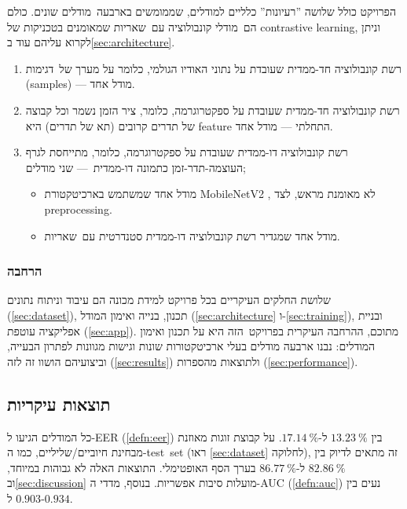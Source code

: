 \documentclass[hebrew, a4paper]{article}
\theoremstyle{plain}
\theoremstyle{definition}
\numberwithin{equation}{section}
\begin{document}
הפרויקט כולל שלושה ”רעיונות” כלליים למודלים, שממומשים בארבעה~מודלים
שונים. כולם הם~מודלי קונבולוציה עם~שאריות  שמאומנים
בטכניקות של contrastive learning, וניתן לקרוא עליהם עוד
ב\autoref{sec:architecture}.
\begin{enumerate}
\item רשת קונבולוציה חד-ממדית שעובדת על נתוני האודיו הגולמי, כלומר על
  מערך של~דגימות (samples) --- מודל אחד.
\item רשת קונבולוציה חד-ממדית שעובדת על ספקטרוגרמה, כלומר, ציר הזמן
  נשמר וכל קבוצה של תדרים קרובים (תא של תדרים) היא feature התחלתי ---
  מודל אחד.
\item רשת קונבולוציה דו-ממדית שעובדת על ספקטרוגרמה, כלומר, מתייחסת
  לגרף העוצמה-תדר-זמן כתמונה דו-ממדית~--- שני מודלים;
  \begin{itemize}
  \item מודל אחד שמשתמש בארכיטקטורת MobileNetV2
    , לא מאומנת מראש, לצד preprocessing.
  \item מודל אחד שמגדיר רשת קונבולוציה דו-ממדית סטנדרטית עם~שאריות.
  \end{itemize}
\end{enumerate}

\subsubsection{הרחבה}
\label{sec:intro-expansion}

שלושת החלקים העיקריים בכל פרויקט למידת מכונה הם עיבוד וניתוח נתונים
(\autoref{sec:dataset}), תכנון, בנייה ואימון המודל
(\autoref{sec:architecture} ו-\autoref{sec:training}), ובניית אפליקציה
עוטפת (\autoref{sec:app}). מתוכם, ההרחבה העיקרית בפרויקט~הזה היא על
תכנון ואימון המודלים: נבנו ארבעה מודלים בעלי ארכיטקטורות שונות וגישות
מגוונות לפתרון הבעייה, וביצועיהם הושוו זה לזה (\autoref{sec:results})
ולתוצאות מהספרות (\autoref{sec:performance}).

\subsection{תוצאות עיקריות}
\label{sec:intro-results}

כל המודלים הגיעו ל-EER (\autoref{defn:eer}) בין $\SI{13.23}{\percent}$
ל-$\SI{17.14}{\percent}$. על קבוצת זוגות מאוזנת מבחינת
חיוביים/שליליים, כמו ה-test~set (ראו \autoref{sec:dataset} לחלוקה), זה
מתאים לדיוק בין $\SI{82.86}{\percent}$ ל-$\SI{86.77}{\percent}$ בערך
הסף האופטימלי. התוצאות האלה לא גבוהות במיוחד,
וב\autoref{sec:discussion} מועלות סיבות אפשריות. בנוסף, מדדי ה-AUC
(\autoref{defn:auc}) נעים בין $\num{0.903}$ ל-$\num{0.934}$.
\end{document}
